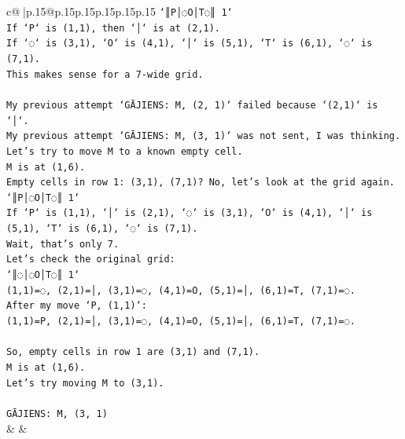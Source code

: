 \documentclass{article}
\begin{document}
{\begin{supertabular}{c@{$\;$}|p{.15\linewidth}@{}p{.15\linewidth}p{.15\linewidth}p{.15\linewidth}p{.15\linewidth}p{.15\linewidth}}
{{{\texttt{`║P│◌O│T◌║ 1`} \\
\texttt{If `P` is (1,1), then `│` is at (2,1).} \\
\texttt{If `◌` is (3,1), `O` is (4,1), `│` is (5,1), `T` is (6,1), `◌` is (7,1).} \\
\texttt{This makes sense for a 7{-}wide grid.} \\
\\ 
\texttt{My previous attempt `GĀJIENS: M, (2, 1)` failed because `(2,1)` is `│`.} \\
\texttt{My previous attempt `GĀJIENS: M, (3, 1)` was not sent, I was thinking.} \\
\texttt{Let's try to move M to a known empty cell.} \\
\texttt{M is at (1,6).} \\
\texttt{Empty cells in row 1: (3,1), (7,1)? No, let's look at the grid again.} \\
\texttt{`║P│◌O│T◌║ 1`} \\
\texttt{If `P` is (1,1), `│` is (2,1), `◌` is (3,1), `O` is (4,1), `│` is (5,1), `T` is (6,1), `◌` is (7,1).} \\
\texttt{Wait, that's only 7.} \\
\texttt{Let's check the original grid:} \\
\texttt{`║◌│◌O│T◌║ 1`} \\
\texttt{(1,1)=◌, (2,1)=│, (3,1)=◌, (4,1)=O, (5,1)=│, (6,1)=T, (7,1)=◌.} \\
\texttt{After my move `P, (1,1)`:} \\
\texttt{(1,1)=P, (2,1)=│, (3,1)=◌, (4,1)=O, (5,1)=│, (6,1)=T, (7,1)=◌.} \\
\\ 
\texttt{So, empty cells in row 1 are (3,1) and (7,1).} \\
\texttt{M is at (1,6).} \\
\texttt{Let's try moving M to (3,1).} \\
\\ 
\texttt{GĀJIENS: M, (3, 1)} \\
            }
        }
    }
    & & \\ \\


\end{supertabular}}
\end{document}
